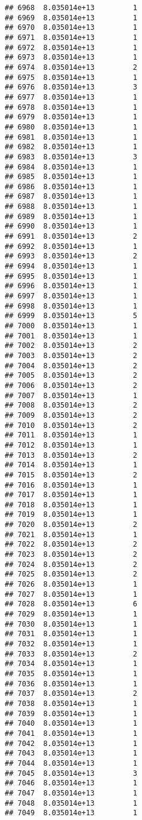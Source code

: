\documentclass[
]{article}
\begin{document}
\begin{verbatim}
## 6968  8.035014e+13         1
## 6969  8.035014e+13         1
## 6970  8.035014e+13         1
## 6971  8.035014e+13         1
## 6972  8.035014e+13         1
## 6973  8.035014e+13         1
## 6974  8.035014e+13         2
## 6975  8.035014e+13         1
## 6976  8.035014e+13         3
## 6977  8.035014e+13         1
## 6978  8.035014e+13         1
## 6979  8.035014e+13         1
## 6980  8.035014e+13         1
## 6981  8.035014e+13         1
## 6982  8.035014e+13         1
## 6983  8.035014e+13         3
## 6984  8.035014e+13         1
## 6985  8.035014e+13         1
## 6986  8.035014e+13         1
## 6987  8.035014e+13         1
## 6988  8.035014e+13         1
## 6989  8.035014e+13         1
## 6990  8.035014e+13         1
## 6991  8.035014e+13         2
## 6992  8.035014e+13         1
## 6993  8.035014e+13         2
## 6994  8.035014e+13         1
## 6995  8.035014e+13         1
## 6996  8.035014e+13         1
## 6997  8.035014e+13         1
## 6998  8.035014e+13         1
## 6999  8.035014e+13         5
## 7000  8.035014e+13         1
## 7001  8.035014e+13         1
## 7002  8.035014e+13         2
## 7003  8.035014e+13         2
## 7004  8.035014e+13         2
## 7005  8.035014e+13         2
## 7006  8.035014e+13         2
## 7007  8.035014e+13         1
## 7008  8.035014e+13         2
## 7009  8.035014e+13         2
## 7010  8.035014e+13         2
## 7011  8.035014e+13         1
## 7012  8.035014e+13         1
## 7013  8.035014e+13         2
## 7014  8.035014e+13         1
## 7015  8.035014e+13         2
## 7016  8.035014e+13         1
## 7017  8.035014e+13         1
## 7018  8.035014e+13         1
## 7019  8.035014e+13         1
## 7020  8.035014e+13         2
## 7021  8.035014e+13         1
## 7022  8.035014e+13         2
## 7023  8.035014e+13         2
## 7024  8.035014e+13         2
## 7025  8.035014e+13         2
## 7026  8.035014e+13         1
## 7027  8.035014e+13         1
## 7028  8.035014e+13         6
## 7029  8.035014e+13         1
## 7030  8.035014e+13         1
## 7031  8.035014e+13         1
## 7032  8.035014e+13         1
## 7033  8.035014e+13         2
## 7034  8.035014e+13         1
## 7035  8.035014e+13         1
## 7036  8.035014e+13         1
## 7037  8.035014e+13         2
## 7038  8.035014e+13         1
## 7039  8.035014e+13         1
## 7040  8.035014e+13         1
## 7041  8.035014e+13         1
## 7042  8.035014e+13         1
## 7043  8.035014e+13         1
## 7044  8.035014e+13         1
## 7045  8.035014e+13         3
## 7046  8.035014e+13         1
## 7047  8.035014e+13         1
## 7048  8.035014e+13         1
## 7049  8.035014e+13         1

\end{verbatim}
\end{document}
